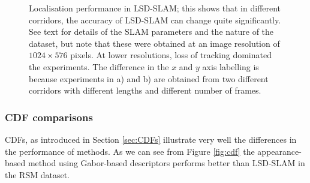 \begin{figure}
	\centering
	\quad
	\caption{Localisation performance in LSD-SLAM; this shows that in different corridors, the accuracy of LSD-SLAM can change quite significantly. See text for details of the SLAM parameters and the nature of the dataset, but note that these were obtained at an image resolution of $1024 \times 576$ pixels. At lower resolutions, loss of tracking dominated the experiments. The difference in the $x$ and $y$ axis labelling is because experiments in a) and b) are obtained from two different corridors with different lengths and different number of frames.}
	\label{fig:slamperf}
\end{figure}


\subsubsection{CDF comparisons}

CDFs, as introduced in Section \ref{sec:CDFs} illustrate very well the differences in the performance of methods. As we can see from Figure \ref{fig:cdf} the appearance-based method using Gabor-based descriptors performs better than LSD-SLAM in the RSM dataset. 

